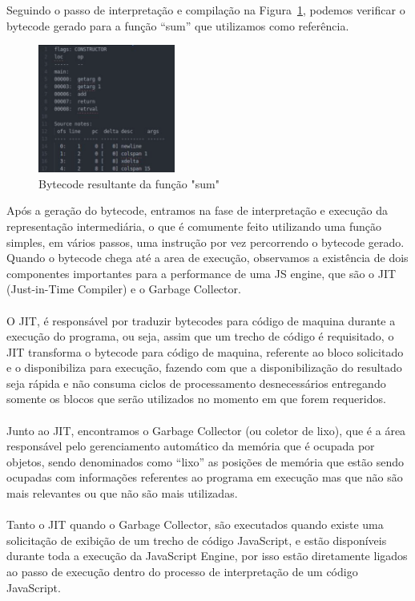 \documentclass[12pt,a4paper]{article}
\begin{document}
Seguindo o passo de interpretação e compilação na Figura~\ref{fig:figura5}, podemos verificar o bytecode gerado para a função “sum” que utilizamos como referência. \\

\begin{figure}[h]
	\centering
	\includegraphics[width=0.4\textwidth]{figura5.png}
	\caption{Bytecode resultante da função "sum"}
	\label{fig:figura5}
\end{figure}

Após a geração do bytecode, entramos na fase de interpretação e execução da representação intermediária, o que é comumente feito utilizando uma função simples, em vários passos, uma instrução por vez percorrendo o bytecode gerado. Quando o bytecode chega até a area de execução, observamos a existência de dois componentes importantes para a performance de uma JS engine, que são o JIT (Just-in-Time Compiler) e o Garbage Collector. \\
\\
O JIT, é responsável por traduzir bytecodes para código de maquina durante a execução do programa, ou seja, assim que um trecho de código é requisitado, o JIT transforma o bytecode para código de maquina, referente ao bloco solicitado e o disponibiliza para execução, fazendo com que a disponibilização do resultado seja rápida e não consuma ciclos de processamento desnecessários entregando somente os blocos que serão utilizados no momento em que forem requeridos. \\
\\
Junto ao JIT, encontramos o Garbage Collector (ou coletor de lixo), que é a área responsável pelo gerenciamento automático da memória que é ocupada por objetos, sendo denominados como “lixo” as posições de memória que estão sendo ocupadas com informações referentes ao programa em execução mas que não são mais relevantes ou que não são mais utilizadas. \\
\\
Tanto o JIT quando o Garbage Collector, são executados quando existe uma solicitação de exibição de um trecho de código JavaScript, e estão disponíveis durante toda a execução da JavaScript Engine, por isso estão diretamente ligados ao passo de execução dentro do processo de interpretação de um código JavaScript.
\end{document}
